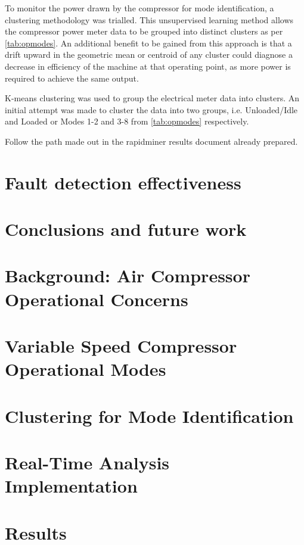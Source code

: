 To monitor the power drawn by the compressor for mode identification, a clustering methodology was trialled. This unsupervised learning method allows the compressor power meter data to be grouped into distinct clusters as per \autoref{tab:opmodes}. An additional benefit to be gained from this approach is that a drift upward in the geometric mean or centroid of any cluster could diagnose a decrease in efficiency of the machine at that operating point, as more power is required to achieve the same output.

K-means clustering was used to group the electrical meter data into clusters. An initial attempt was made to cluster the data into two groups, i.e. Unloaded/Idle and Loaded or Modes 1-2 and 3-8 from \autoref{tab:opmodes} respectively.

Follow the path made out in the rapidminer results document already prepared.

\lipsum[1-10]


\section{Fault detection effectiveness}

\section{Conclusions and future work}
\label{sec:conclusions}


\section{Background: Air Compressor Operational Concerns}
\label{sec:1}
\section{Variable Speed Compressor Operational Modes}
\label{sec:2}
\section{Clustering for Mode Identification}
\label{sec:3}
 

\section{Real-Time Analysis Implementation}
\label{sec:4}
\section{Results}
\label{sec:5}
